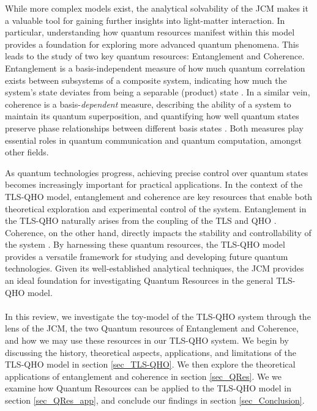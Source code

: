 \documentclass[12pt,a4paper]{article}
\begin{document}
While more complex models exist, the analytical solvability of the JCM makes it a valuable tool for gaining further insights into light-matter interaction. In particular, understanding how quantum resources manifest within this model provides a foundation for exploring more advanced quantum phenomena. This leads to the study of two key quantum resources: Entanglement and Coherence. Entanglement is a basis-independent measure of how much quantum correlation exists between subsystems of a composite system, indicating how much the system's state deviates from being a separable (product) state \cite{Entanglement2009-Definition}. In a similar vein, coherence is a basis-\textit{dependent} measure, describing the ability of a system to maintain its quantum superposition, and quantifying how well quantum states preserve phase relationships between different basis states \cite{Coherence2017-Colloquium}. Both measures play essential roles in quantum communication and quantum computation, amongst other fields.

As quantum technologies progress, achieving precise control over quantum states becomes increasingly important for practical applications. In the context of the TLS-QHO model, entanglement and coherence are key resources that enable both theoretical exploration and experimental control of the system. Entanglement in the TLS-QHO naturally arises from the coupling of the TLS and QHO \cite{Entanglement2009-REE_VNapplied}. Coherence, on the other hand, directly impacts the stability and controllability of the system \cite{Coherence2020-JCMapplied}.  By harnessing these quantum resources, the TLS-QHO model provides a versatile framework for studying and developing future quantum technologies. Given its well-established analytical techniques, the JCM provides an ideal foundation for investigating Quantum Resources in the general TLS-QHO model.  \\
\\
In this review, we investigate the toy-model of the TLS-QHO system through the lens of the JCM, the two Quantum resources of Entanglement and Coherence, and how we may use these resources in our TLS-QHO system. We begin by discussing the history, theoretical aspects, applications, and limitations of the TLS-QHO model in section \ref{sec_TLS-QHO}. We then explore the theoretical applications of entanglement and coherence in section \ref{sec_QRes}. We we examine how Quantum Resources can be applied to the TLS-QHO model in section \ref{sec_QRes_app}, and conclude our findings in section \ref{sec_Conclusion}.
\end{document}
